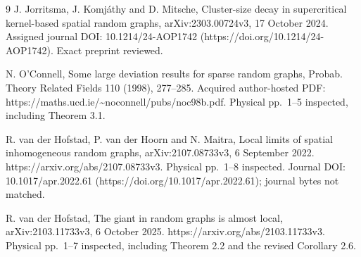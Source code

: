 \documentclass[10pt]{article}
\begin{document}
9 J. Jorritsma, J. Komjáthy and D. Mitsche, Cluster-size decay in supercritical kernel-based spatial random graphs, arXiv:2303.00724v3, 17 October 2024. Assigned journal DOI: 10.1214/24-AOP1742 (https://doi.org/10.1214/24-AOP1742). Exact preprint reviewed.\par
N. O’Connell, Some large deviation results for sparse random graphs, Probab. Theory Related Fields 110 (1998), 277–285. Acquired author-hosted PDF: https://maths.ucd.ie/\textasciitilde{}noconnell/pubs/noc98b.pdf. Physical pp. 1–5 inspected, including Theorem 3.1.\par
R. van der Hofstad, P. van der Hoorn and N. Maitra, Local limits of spatial inhomogeneous random graphs, arXiv:2107.08733v3, 6 September 2022. https://arxiv.org/abs/2107.08733v3. Physical pp. 1–8 inspected. Journal DOI: 10.1017/apr.2022.61 (https://doi.org/10.1017/apr.2022.61); journal bytes not matched.\par
R. van der Hofstad, The giant in random graphs is almost local, arXiv:2103.11733v3, 6 October 2025. https://arxiv.org/abs/2103.11733v3. Physical pp. 1–7 inspected, including Theorem 2.2 and the revised Corollary 2.6.\par
\end{document}
